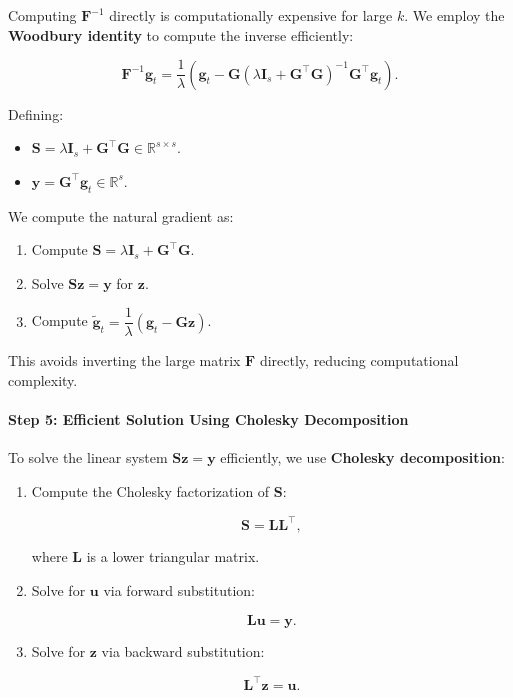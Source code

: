 Computing $\mathbf{F}^{-1}$ directly is computationally expensive for large $k$. We employ the \textbf{Woodbury identity} to compute the inverse efficiently:

\[
\mathbf{F}^{-1} \mathbf{g}_t = \frac{1}{\lambda} \left( \mathbf{g}_t - \mathbf{G} \left( \lambda \mathbf{I}_s + \mathbf{G}^\top \mathbf{G} \right)^{-1} \mathbf{G}^\top \mathbf{g}_t \right).
\]

Defining:

\begin{itemize}
    \item $\mathbf{S} = \lambda \mathbf{I}_s + \mathbf{G}^\top \mathbf{G} \in \mathbb{R}^{s \times s}$.
    \item $\mathbf{y} = \mathbf{G}^\top \mathbf{g}_t \in \mathbb{R}^s$.
\end{itemize}

We compute the natural gradient as:

\begin{enumerate}
    \item Compute $\mathbf{S} = \lambda \mathbf{I}_s + \mathbf{G}^\top \mathbf{G}$.
    \item Solve $\mathbf{S} \mathbf{z} = \mathbf{y}$ for $\mathbf{z}$.
    \item Compute $\tilde{\mathbf{g}}_t = \dfrac{1}{\lambda} \left( \mathbf{g}_t - \mathbf{G} \mathbf{z} \right)$.
\end{enumerate}

This avoids inverting the large matrix $\mathbf{F}$ directly, reducing computational complexity.

\paragraph{Step 5: Efficient Solution Using Cholesky Decomposition}

To solve the linear system $\mathbf{S} \mathbf{z} = \mathbf{y}$ efficiently, we use \textbf{Cholesky decomposition}:

\begin{enumerate}
    \item Compute the Cholesky factorization of $\mathbf{S}$:

    \[
    \mathbf{S} = \mathbf{L} \mathbf{L}^\top,
    \]

    where $\mathbf{L}$ is a lower triangular matrix.

    \item Solve for $\mathbf{u}$ via forward substitution:

    \[
    \mathbf{L} \mathbf{u} = \mathbf{y}.
    \]

    \item Solve for $\mathbf{z}$ via backward substitution:

    \[
    \mathbf{L}^\top \mathbf{z} = \mathbf{u}.
    \]
\end{enumerate}

